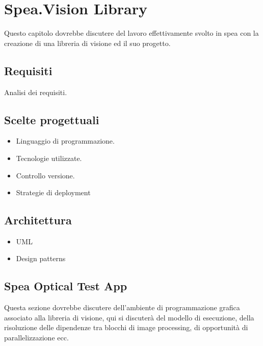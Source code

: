\chapter{Spea.Vision Library}
Questo capitolo dovrebbe discutere del lavoro effettivamente
svolto in spea con la creazione di una libreria di visione
ed il suo progetto.

\section{Requisiti}
Analisi dei requisiti.

\section{Scelte progettuali}

\begin{itemize}
\item Linguaggio di programmazione.
\item Tecnologie utilizzate.
\item Controllo versione.
\item Strategie di deployment
\end{itemize}

\section{Architettura}

\begin{itemize}
\item UML
\item Design patterns
\end{itemize}

\section{Spea Optical Test App}
Questa sezione dovrebbe discutere dell'ambiente di programmazione
grafica associato alla libreria di visione, qui si discuterà del
modello di esecuzione, della risoluzione delle dipendenze tra blocchi
di image processing, di opportunità di parallelizzazione ecc.

\endinput